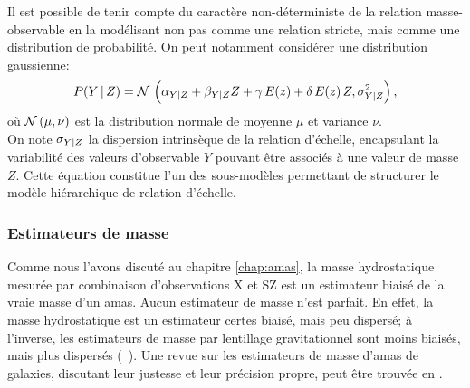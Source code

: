 Il est possible de tenir compte du caractère non-déterministe de la relation masse-observable en la modélisant non pas comme une relation stricte, mais comme une distribution de probabilité.
On peut notamment considérer une distribution gaussienne:
\begin{equation}
    \label{eq:scaling:general_pdf}
    P({Y\,|\,Z}) = \mathcal{N}\, \left(\alpha_{Y|Z} + \beta_{Y|Z} Z + \gamma \, E(z) + \delta \, E(z) \, Z, \sigma_{Y|Z}^2 \right),
\end{equation}
où $\mathcal{N}\,(\mu, \nu)$ est la distribution normale de moyenne $\mu$ et variance $\nu$. \\
On note $\sigma_{Y|Z}$ la dispersion intrinsèque de la relation d'échelle, encapsulant la variabilité des valeurs d'observable $Y$ pouvant être associés à une valeur de masse $Z$.
Cette équation constitue l'un des sous-modèles permettant de structurer le modèle hiérarchique de relation d'échelle.

\subsubsection{Estimateurs de masse} %
\label{sec:eddington_biases}

Comme nous l'avons discuté au chapitre \ref{chap:amas}, la masse hydrostatique mesurée par combinaison d'observations X et SZ est un estimateur biaisé de la vraie masse d'un amas.
Aucun estimateur de masse n'est parfait.
En effet, la masse hydrostatique est un estimateur certes biaisé, mais peu dispersé; à l'inverse, les estimateurs de masse par lentillage gravitationnel sont moins biaisés, mais plus dispersés (\eg\ \cite{grandis_calibration_2021,sommer_weak_2021}).
Une revue sur les estimateurs de masse d'amas de galaxies, discutant leur justesse et leur précision propre, peut être trouvée en \cite{pratt_galaxy_2019}.

